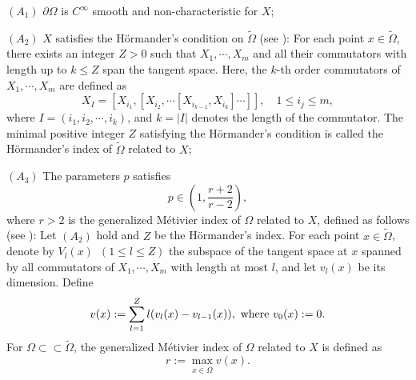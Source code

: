 \documentclass[11pt,a4paper]{article}
\numberwithin{equation}{section}
\numberwithin{remark}{section}
\begin{document}
\begin{description}
  \item{$(A_1)$} $\partial\Omega$ is $C^\infty$ smooth and non-characteristic for $X$;
  \item{$(A_2)$} $X$ satisfies the H\"{o}rmander's condition on $\tilde{\Omega}$ (see \cite{MR222474}):
      For each point $x\in\tilde{\Omega}$, there exists an integer $Z>0$ such that $X_1,\cdots,X_m$ and all their commutators with length up to $k\leq Z$ span the tangent space. Here, the $k$-th order commutators of $X_1,\cdots,X_m$ are defined as
      \begin{equation*}
      X_I=[X_{i_1},[X_{i_2},\cdots[X_{i_{k-1}},X_{i_k}]\cdots]],\quad 1\leq i_j\leq m,
      \end{equation*}
      where $I=(i_1,i_2,\cdots,i_k)$, and $k=|I|$ denotes the length of the commutator. The minimal positive integer $Z$ satisfying the H\"{o}rmander's condition is called the H\"{o}rmander's index of $\tilde{\Omega}$ related to $X$;
  \item{$(A_3)$} The parameters $p$ satisfies
\begin{equation*}
p\in\left(1,\frac{r+2}{r-2}\right),
\end{equation*}
where $r>2$ is the generalized M\'{e}tivier index of $\Omega$ related to $X$, defined as follows (see \cite{MR427858,MR3412394,MR3354435}): Let $(A_2)$ hold and $Z$ be the H\"{o}rmander's index. For each point $x\in\tilde{\Omega}$, denote by $V_l(x)$~$(1\leq l\leq Z)$ the subspace of the tangent space at $x$ spanned by all commutators of $X_1,\cdots,X_m$ with length at most $l$, and let $v_l(x)$ be its dimension. Define \begin{equation*}
v(x):=\sum_{l=1}^Zl(v_l(x)-v_{l-1}(x)),\hbox{ where }v_0(x):=0.
\end{equation*}
For $\Omega\subset\subset \tilde{\Omega}$, the generalized M\'{e}tivier index of $\Omega$ related to $X$ is defined as
\begin{equation*}
r:=\max_{x\in\overline{\Omega}}v(x).
\end{equation*}
\end{description}
\end{document}
